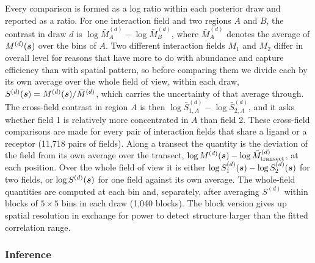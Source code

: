 \documentclass[10pt,letterpaper]{article}
\begin{document}
Every comparison is formed as a log ratio within each posterior draw and reported as a ratio. For one interaction field and two regions $A$ and $B$, the contrast in draw $d$ is $\log \bar{M}^{(d)}_A - \log \bar{M}^{(d)}_B$, where $\bar{M}^{(d)}_A$ denotes the average of $M^{(d)}(\mbox{\boldmath $s$})$ over the bins of $A$. Two different interaction fields $M_1$ and $M_2$ differ in overall level for reasons that have more to do with abundance and capture efficiency than with spatial pattern, so before comparing them we divide each by its own average over the whole field of view, within each draw, $S^{(d)}(\mbox{\boldmath $s$}) = M^{(d)}(\mbox{\boldmath $s$}) / \bar{M}^{(d)}$, which carries the uncertainty of that average through. The cross-field contrast in region $A$ is then $\log \bar{S}^{(d)}_{1,A} - \log \bar{S}^{(d)}_{2,A}$, and it asks whether field 1 is relatively more concentrated in $A$ than field 2. These cross-field comparisons are made for every pair of interaction fields that share a ligand or a receptor (11,718 pairs of fields). Along a transect the quantity is the deviation of the field from its own average over the transect, $\log M^{(d)}(\mbox{\boldmath $s$}) - \log \bar{M}^{(d)}_{\text{transect}}$, at each position. Over the whole field of view it is either $\log S_1^{(d)}(\mbox{\boldmath $s$}) - \log S_2^{(d)}(\mbox{\boldmath $s$})$ for two fields, or $\log S^{(d)}(\mbox{\boldmath $s$})$ for one field against its own average. The whole-field quantities are computed at each bin and, separately, after averaging $S^{(d)}$ within blocks of $5 \times 5$ bins in each draw (1,040 blocks). The block version gives up spatial resolution in exchange for power to detect structure larger than the fitted correlation range.

\subsubsection*{Inference}
\end{document}
